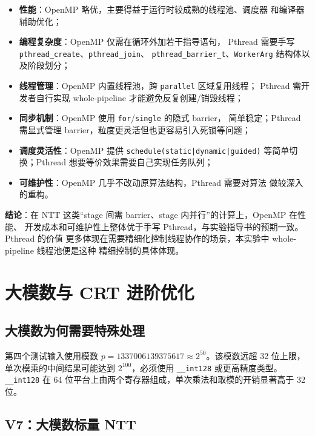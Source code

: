 \documentclass[UTF8,a4paper,10pt]{ctexart}
\begin{document}
\begin{itemize}
  \item \textbf{性能}：OpenMP 略优，主要得益于运行时较成熟的线程池、调度器
        和编译器辅助优化；
  \item \textbf{编程复杂度}：OpenMP 仅需在循环外加若干指导语句，
        Pthread 需要手写 \texttt{pthread\_create}、\texttt{pthread\_join}、
        \texttt{pthread\_barrier\_t}、\texttt{WorkerArg} 结构体以及阶段划分；
  \item \textbf{线程管理}：OpenMP 内置线程池，跨 \texttt{parallel} 区域复用线程；
        Pthread 需开发者自行实现 whole-pipeline 才能避免反复创建/销毁线程；
  \item \textbf{同步机制}：OpenMP 使用 \texttt{for}/\texttt{single} 的隐式 barrier，
        简单稳定；Pthread 需显式管理 barrier，粒度更灵活但也更容易引入死锁等问题；
  \item \textbf{调度灵活性}：OpenMP 提供 \texttt{schedule(static|dynamic|guided)}
        等简单切换；Pthread 想要等价效果需要自己实现任务队列；
  \item \textbf{可维护性}：OpenMP 几乎不改动原算法结构，Pthread 需要对算法
        做较深入的重构。
\end{itemize}

\textbf{结论}：在 NTT 这类``stage 间需 barrier、stage 内并行''的计算上，OpenMP 在性能、
开发成本和可维护性上整体优于手写 Pthread，与实验指导书的预期一致。Pthread 的价值
更多体现在需要精细化控制线程协作的场景，本实验中 whole-pipeline 线程池便是这种
精细控制的具体体现。

\section{大模数与 CRT 进阶优化}

\subsection{大模数为何需要特殊处理}

第四个测试输入使用模数 $p = 1337006139375617 \approx 2^{50}$。该模数远超 32 位上限，
单次模乘的中间结果可能达到 $2^{100}$，必须使用 \texttt{\_\_int128} 或更高精度类型。
\texttt{\_\_int128} 在 64 位平台上由两个寄存器组成，单次乘法和取模的开销显著高于 32 位。

\subsection{V7：大模数标量 NTT}
\end{document}
